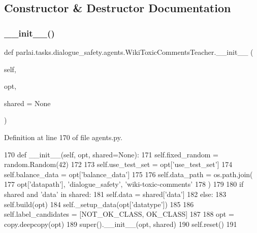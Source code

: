 \subsection{Constructor \& Destructor Documentation}
\mbox{\label{classparlai_1_1tasks_1_1dialogue__safety_1_1agents_1_1WikiToxicCommentsTeacher_ac9189c0fbd25d24bf036aadee0fa3aaf}} 
\subsubsection{\texorpdfstring{\+\_\+\+\_\+init\+\_\+\+\_\+()}{\_\_init\_\_()}}
{\footnotesize\ttfamily def parlai.\+tasks.\+dialogue\+\_\+safety.\+agents.\+Wiki\+Toxic\+Comments\+Teacher.\+\_\+\+\_\+init\+\_\+\+\_\+ (\begin{DoxyParamCaption}\item[{}]{self,  }\item[{}]{opt,  }\item[{}]{shared = {\ttfamily None} }\end{DoxyParamCaption})}



Definition at line 170 of file agents.\+py.


\begin{DoxyCode}
170     \textcolor{keyword}{def }\_\_init\_\_(self, opt, shared=None):
171         self.fixed\_random = random.Random(42)
172 
173         self.use\_test\_set = opt[\textcolor{stringliteral}{'use\_test\_set'}]
174         self.balance\_data = opt[\textcolor{stringliteral}{'balance\_data'}]
175 
176         self.data\_path = os.path.join(
177             opt[\textcolor{stringliteral}{'datapath'}], \textcolor{stringliteral}{'dialogue\_safety'}, \textcolor{stringliteral}{'wiki-toxic-comments'}
178         )
179 
180         \textcolor{keywordflow}{if} shared \textcolor{keywordflow}{and} \textcolor{stringliteral}{'data'} \textcolor{keywordflow}{in} shared:
181             self.data = shared[\textcolor{stringliteral}{'data'}]
182         \textcolor{keywordflow}{else}:
183             self.build(opt)
184             self.\_setup\_data(opt[\textcolor{stringliteral}{'datatype'}])
185 
186         self.label\_candidates = [NOT\_OK\_CLASS, OK\_CLASS]
187 
188         opt = copy.deepcopy(opt)
189         super().\_\_init\_\_(opt, shared)
190         self.reset()
191 
\end{DoxyCode}


